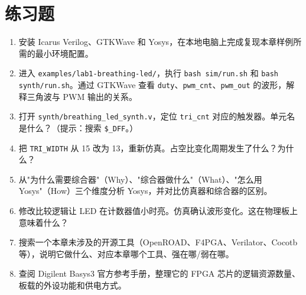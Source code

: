 \documentclass[11pt,a4paper]{article}
\begin{document}
\section{练习题}

\begin{enumerate}
  \item 安装 Icarus Verilog、GTKWave 和 Yosys，在本地电脑上完成复现本章样例所需的最小环境配置。
  \item 进入 \texttt{examples/lab1-breathing-led/}，执行 \texttt{bash sim/run.sh} 和 \texttt{bash synth/run.sh}。通过 GTKWave 查看 \texttt{duty}、\texttt{pwm\_cnt}、\texttt{pwm\_out} 的波形，解释三角波与 PWM 输出的关系。
  \item 打开 \texttt{synth/breathing\_led\_synth.v}，定位 \texttt{tri\_cnt} 对应的触发器。单元名是什么？（提示：搜索 \texttt{\$\_DFF}。）
  \item 把 \texttt{TRI\_WIDTH} 从 15 改为 13，重新仿真。占空比变化周期发生了什么？为什么？
  \item 从"为什么需要综合器"（Why）、"综合器做什么"（What）、"怎么用 Yosys"（How）三个维度分析 Yosys，并对比仿真器和综合器的区别。
  \item 修改比较逻辑让 LED 在计数器值小时亮。仿真确认波形变化。这在物理板上意味着什么？
  \item 搜索一个本章未涉及的开源工具（OpenROAD、F4PGA、Verilator、Cocotb 等），说明它做什么、对应本章哪个工具、强在哪/弱在哪。
  \item 查阅 Digilent Basys3 官方参考手册，整理它的 FPGA 芯片的逻辑资源数量、板载的外设功能和供电方式。
\end{enumerate}
\end{document}
